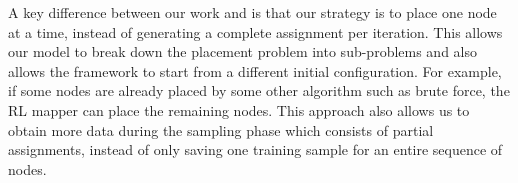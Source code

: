 
A key difference between our work and \cite{zhou2019gdp} is that our strategy is to place one node at a time, instead of generating a complete assignment per iteration. 
This allows our model to break down the placement problem into sub-problems and also allows the framework to start from a different initial configuration. 
For example, if some nodes are already placed by some other algorithm such as brute force, the RL mapper can place the remaining nodes. 
This approach also allows us to obtain more data during the sampling phase which consists of partial assignments, instead of only saving one training sample for an entire sequence of nodes.